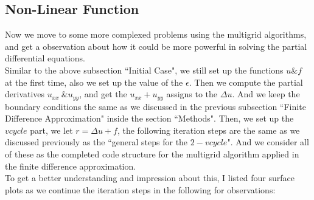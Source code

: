 \documentclass [a4paper, 12pt]{article}
\begin{document}
\subsection {Non-Linear Function}
Now we move to some more complexed problems using the multigrid algorithms, and get a observation about how it could be more powerful in solving the partial differential equations. \\
Similar to the above subsection ``Initial Case", we still set up the functions $u \& f$ at the first time, also we set up the value of the $\epsilon$. Then we compute the partial derivatives $u_{xx}  \  \& u_{yy}$, and get the $u_{xx}+u_{yy}$ assigns to the $\Delta u$. And we keep the boundary conditions the same as we discussed in the previous subsection ``Finite Difference Approximation" inside the section ``Methods".  Then, we set up the $vcycle$ part, we let $r=\Delta u+f$, the following iteration steps are the same as we discussed previously as the ``general steps for the $2-vcycle$". And we consider all of these as the completed code structure for the multigrid algorithm applied in the finite difference approximation. \\
To get a better understanding and impression about this, I listed four surface plots as we continue the iteration steps in the following for observations:
\end{document}
